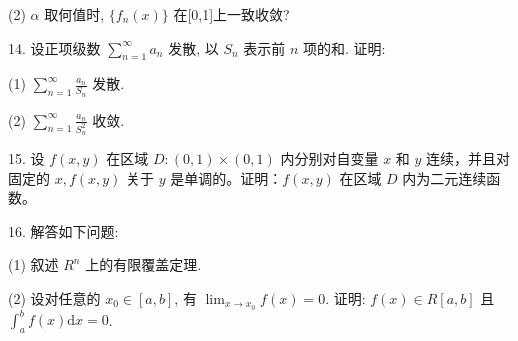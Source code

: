 \documentclass{examcollection}
\begin{document}
{\begin{minipage}{\textwidth}
(2) $\alpha$ 取何值时, $\{f_n(x)\}$ 在[0,1]上一致收敛?\par
14. 设正项级数 $\sum_{n=1}^{\infty} a_n$ 发散, 以 $S_n$ 表示前 $n$ 项的和. 证明:\par
(1) $\sum_{n=1}^{\infty} \frac{a_n}{S_n}$ 发散.\par
(2) $\sum_{n=1}^{\infty} \frac{a_n}{S_n^2}$ 收敛.\par
15. 设 $f(x, y)$ 在区域 $D: (0, 1) \times (0, 1)$ 内分别对自变量 $x$ 和 $y$ 连续，并且对固定的 $x, f(x, y)$ 关于 $y$ 是单调的。证明：$f(x, y)$ 在区域 $D$ 内为二元连续函数。\par
16. 解答如下问题:\par
(1) 叙述  $R^{n}$  上的有限覆盖定理.\par
(2) 设对任意的 $x_0 \in [a, b]$, 有 $\lim_{x \to x_0} f(x) = 0$. 证明: $f(x) \in R[a, b]$ 且 $\int_{a}^{b} f(x) \mathrm{d}x = 0$.\par
\end{minipage}}
\ifdim\dimexpr\ht\proofbox+\dp\proofbox\relax>\textheight
\noindent\resizebox{!}{\textheight}{\usebox{\proofbox}}\else\noindent\usebox{\proofbox}\fi\clearpage
\end{document}
